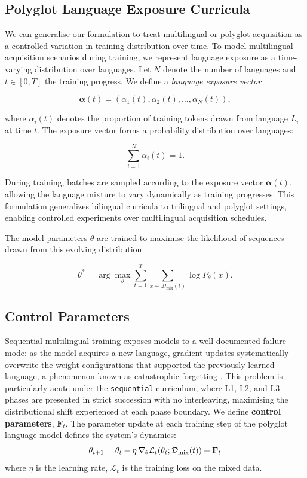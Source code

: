 \subsection{Polyglot Language Exposure Curricula}


We can generalise our formulation to treat multilingual or polyglot acquisition as a controlled variation in training distribution over time. To model multilingual acquisition scenarios during training, we represent language exposure as a time-varying distribution over languages. 
Let $N$ denote the number of languages and $t \in [0,T]$ the training progress. 
We define a \textit{language exposure vector}

\[
\boldsymbol{\alpha}(t) = (\alpha_1(t), \alpha_2(t), \dots, \alpha_N(t)),
\]

where $\alpha_i(t)$ denotes the proportion of training tokens drawn from language $L_i$ at time $t$. 
The exposure vector forms a probability distribution over languages:

\[
\sum_{i=1}^{N} \alpha_i(t) = 1.
\]

During training, batches are sampled according to the exposure vector $\boldsymbol{\alpha}(t)$, allowing the language mixture to vary dynamically as training progresses. This formulation generalizes bilingual curricula to trilingual and polyglot settings, enabling controlled experiments over multilingual acquisition schedules.

The model parameters $\theta$ are trained to maximise the likelihood of sequences drawn from this evolving distribution:

\[
\theta^* = \arg\max_\theta 
\sum_{t=1}^{T} 
\sum_{x \sim \mathcal{D}_{\text{mix}}(t)}
\log P_\theta(x).
\]


\subsection{Control Parameters}

Sequential multilingual training exposes models to a well-documented failure mode: as the model acquires a new language, gradient updates systematically overwrite the weight configurations that supported the previously learned language, a phenomenon known as catastrophic forgetting \citep{mccloskey1989catastrophic,kirkpatrick2017overcoming}. This problem is particularly acute under the \texttt{sequential} curriculum, where L1, L2, and L3 phases are presented in strict succession with no interleaving, maximising the distributional shift experienced at each phase boundary.  We  define \textbf{control parameters}, $\mathbf{F}_t$, The parameter update at each training step of the polyglot language model defines the system's dynamics:
\begin{equation}
\theta_{t+1} = \theta_t - \eta \, \mathnormal{\nabla}_{\theta} \mathcal{L}_t(\theta_t; \mathcal{D}_{\mathrm{mix}}(t)) + \mathbf{F}_t
\end{equation}
where $\eta$ is the learning rate, $\mathcal{L}_t$ is the training loss on the mixed data.

